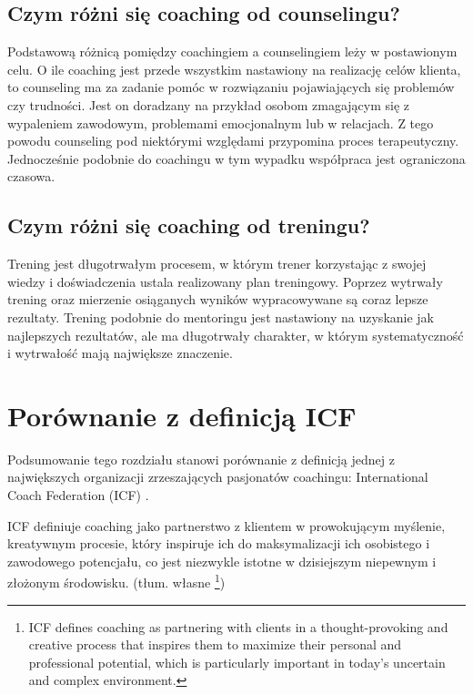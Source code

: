 \subsection{Czym różni się coaching od counselingu?}

Podstawową różnicą pomiędzy coachingiem a counselingiem leży w postawionym celu. O ile coaching jest przede wszystkim nastawiony na realizację celów
klienta, to counseling ma za zadanie pomóc w rozwiązaniu pojawiających się problemów czy trudności. Jest on doradzany na przykład osobom zmagającym się
z wypaleniem zawodowym, problemami emocjonalnym lub w relacjach. Z tego powodu counseling pod niektórymi względami przypomina proces terapeutyczny.
Jednocześnie podobnie do coachingu w tym wypadku współpraca jest ograniczona czasowa.

\subsection{Czym różni się coaching od treningu?}

Trening jest długotrwałym procesem, w którym trener korzystając z swojej wiedzy i doświadczenia ustala realizowany plan treningowy. Poprzez wytrwały
trening oraz mierzenie osiąganych wyników wypracowywane są coraz lepsze rezultaty. Trening podobnie do mentoringu jest nastawiony na uzyskanie
jak najlepszych rezultatów, ale ma długotrwały charakter, w którym systematyczność i wytrwałość mają największe znaczenie.

\section{Porównanie z definicją ICF}
Podsumowanie tego rozdziału stanowi porównanie z definicją jednej z największych organizacji zrzeszających pasjonatów coachingu:
International Coach Federation (ICF) \cite{deficf}.

\begin{defn}
ICF definiuje coaching jako partnerstwo z klientem w prowokującym myślenie, kreatywnym procesie, który inspiruje ich do maksymalizacji ich
osobistego i zawodowego potencjału, co jest niezwykle istotne w dzisiejszym niepewnym i złożonym środowisku. (tłum. własne
\footnote{ICF defines coaching as partnering with clients in a thought-provoking and creative process that inspires them to maximize
their personal and professional potential, which is particularly important in today's uncertain and complex environment.})
\end{defn}

